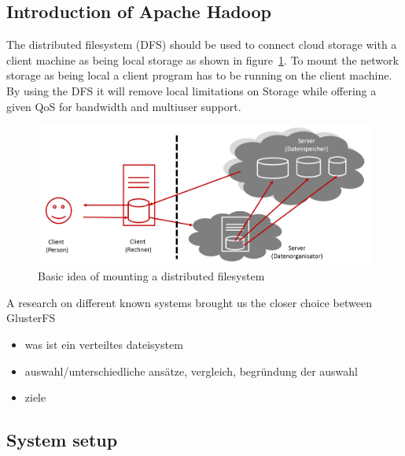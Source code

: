 \subsection{Introduction of Apache Hadoop}

The distributed filesystem (DFS) should be used to connect cloud storage with a client machine as being local storage as shown in figure~\ref{fig:dfs_example}. To mount the network storage as being local a client program has to be running on the client machine. By using the DFS it will remove local limitations on Storage while offering a given QoS for bandwidth and multiuser support.


\begin{figure}
	\centering
	\includegraphics[width=1\linewidth]{img/dfs_example.png}
	\caption{Basic idea of mounting a distributed filesystem}
	\label{fig:dfs_example}
\end{figure}

A research on different known systems brought us the closer choice between GlusterFS 


\begin{itemize}
	\item was ist ein verteiltes dateisystem
	\item auswahl/unterschiedliche ansätze, vergleich, begründung der auswahl
	\item ziele
\end{itemize}


\subsection{System setup}

